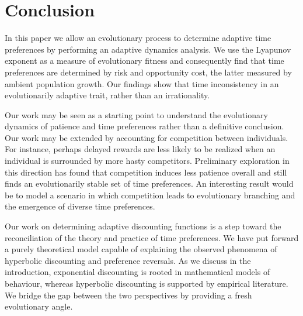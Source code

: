 \documentclass[titlepage, hidelinks, 12pt]{article}
\theoremstyle{plain}
\theoremstyle{remark}
\theoremstyle{definition}
\begin{document}


















\section{Conclusion} \label{sec:conclusion}
In this paper we allow an evolutionary process to determine 
adaptive time preferences by performing an adaptive dynamics analysis. We use the Lyapunov exponent as 
a measure of evolutionary fitness and consequently find that time preferences are determined by risk and opportunity cost, the latter
measured by ambient population growth. Our findings show that time inconsistency in an evolutionarily adaptive trait, rather than an
irrationality. 

Our work may be seen as a starting point to understand the evolutionary dynamics of patience and time preferences rather
than a definitive conclusion. Our work may be extended by accounting for competition between individuals. For instance, perhaps
delayed rewards are less likely to be realized when an individual is surrounded by more hasty competitors. 
Preliminary exploration in this direction has found that competition induces less patience overall and still finds an evolutionarily stable
set of time preferences. An interesting result would be to model a scenario in which competition leads to evolutionary branching and the emergence
of diverse time preferences. 

Our work on determining adaptive discounting functions is a step toward the reconciliation of the theory and practice of time preferences. 
We have put forward a purely theoretical model capable of explaining the observed phenomena of hyperbolic discounting and preference
reversals. 
As
we discuss in the introduction, exponential discounting is rooted in mathematical models of behaviour, whereas hyperbolic discounting is supported
by empirical literature. We bridge the gap between the two perspectives by providing a fresh evolutionary angle. 



\newpage

{}
\end{document}
